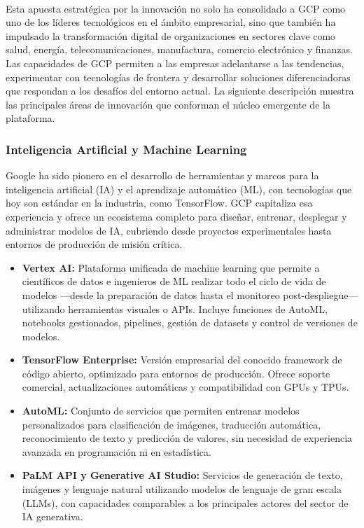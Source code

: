 {            \paragraph{}Esta apuesta estratégica por la innovación no solo ha consolidado a GCP como uno de los líderes tecnológicos en el ámbito empresarial, sino que también ha impulsado la transformación digital de organizaciones en sectores clave como salud, energía, telecomunicaciones, manufactura, comercio electrónico y finanzas. Las capacidades de GCP permiten a las empresas adelantarse a las tendencias, experimentar con tecnologías de frontera y desarrollar soluciones diferenciadoras que respondan a los desafíos del entorno actual. La siguiente descripción muestra las principales áreas de innovación que conforman el núcleo emergente de la plataforma.
            
            \subsubsection{Inteligencia Artificial y Machine Learning}
                Google ha sido pionero en el desarrollo de herramientas y marcos para la inteligencia artificial (IA) y el aprendizaje automático (ML), con tecnologías que hoy son estándar en la industria, como TensorFlow. GCP capitaliza esa experiencia y ofrece un ecosistema completo para diseñar, entrenar, desplegar y administrar modelos de IA, cubriendo desde proyectos experimentales hasta entornos de producción de misión crítica.
            
                \begin{itemize}
                    \item \textbf{Vertex AI:} Plataforma unificada de machine learning que permite a científicos de datos e ingenieros de ML realizar todo el ciclo de vida de modelos —desde la preparación de datos hasta el monitoreo post-despliegue— utilizando herramientas visuales o APIs. Incluye funciones de AutoML, notebooks gestionados, pipelines, gestión de datasets y control de versiones de modelos.
                    \item \textbf{TensorFlow Enterprise:} Versión empresarial del conocido framework de código abierto, optimizado para entornos de producción. Ofrece soporte comercial, actualizaciones automáticas y compatibilidad con GPUs y TPUs.
                    \item \textbf{AutoML:} Conjunto de servicios que permiten entrenar modelos personalizados para clasificación de imágenes, traducción automática, reconocimiento de texto y predicción de valores, sin necesidad de experiencia avanzada en programación ni en estadística.
                    \item \textbf{PaLM API y Generative AI Studio:} Servicios de generación de texto, imágenes y lenguaje natural utilizando modelos de lenguaje de gran escala (LLMs), con capacidades comparables a los principales actores del sector de IA generativa.
                \end{itemize}
                
}
